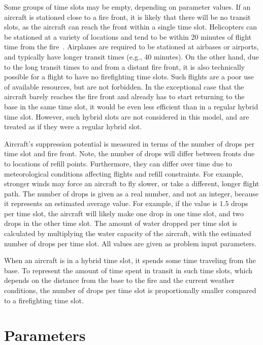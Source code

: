 Some groups of time slots may be empty, depending on parameter values.
If an aircraft is stationed close to a fire front, it is likely that there will be no transit slots, as the aircraft can reach the front within a single time slot.
Helicopters can be stationed at a variety of locations and tend to be within 20 minutes of flight time from the fire~\cite{INFOCACongreso2017}.
Airplanes are required to be stationed at airbases or airports, and typically have longer transit times (e.g., 40 minutes). 
On the other hand, due to the long transit times to and from a distant fire front, it is also technically possible for a flight to have no firefighting time slots.
Such flights are a poor use of available resources, but are not forbidden.
In the exceptional case that the aircraft barely reaches the fire front and already has to start returning to the base in the same time slot, it would be even less efficient than in a regular hybrid time slot.
However, such hybrid slots are not considered in this model, and are treated as if they were a regular hybrid slot.

Aircraft's suppression potential is measured in terms of the number of drops per time slot and fire front.
Note, the number of drops will differ between fronts due to locations of refill points.
Furthermore, they can differ over time due to meteorological conditions affecting flights and refill constraints.
For example, stronger winds may force an aircraft to fly slower, or take a different, longer flight path.
The number of drops is given as a real number, and not an integer, because it represents an estimated average value.
For example, if the value is $1.5$ drops per time slot, the aircraft will likely make one drop in one time slot, and two drops in the other time slot.
The amount of water dropped per time slot is calculated by multiplying the water capacity of the aircraft, with the estimated number of drops per time slot.
All values are given as problem input parameters.

When an aircraft is in a hybrid time slot, it spends some time traveling from the base.
To represent the amount of time spent in transit in such time slots, which depends on the distance from the base to the fire and the current weather conditions, the number of drops per time slot is proportionally smaller compared to a firefighting time slot.


\section{Parameters}

